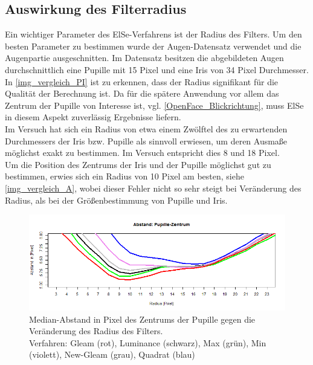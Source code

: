 \subsection{Auswirkung des Filterradius}
Ein wichtiger Parameter des ElSe-Verfahrens ist der Radius des Filters. Um den besten Parameter zu bestimmen wurde der Augen-Datensatz \cite{database_Eye} verwendet und die Augenpartie ausgeschnitten. Im Datensatz besitzen die abgebildeten Augen durchschnittlich eine Pupille mit 15 Pixel und eine Iris von 34 Pixel Durchmesser.\\
In \autoref{img_vergleich_PI} ist zu erkennen, dass der Radius signifikant für die Qualität der Berechnung ist. Da für die spätere Anwendung vor allem das Zentrum der Pupille von Interesse ist, vgl. \autoref{OpenFace_Blickrichtung}, muss ElSe in diesem Aspekt zuverlässig Ergebnisse liefern.\\
Im Versuch hat sich ein Radius von etwa einem Zwölftel des zu erwartenden Durchmessers der Iris bzw. Pupille als sinnvoll erwiesen, um deren Ausmaße möglichst exakt zu bestimmen. Im Versuch entspricht dies 8 und 18 Pixel.\\
Um die Position des Zentrums der Iris und der Pupille möglichst gut zu bestimmen, erwies sich ein Radius von 10 Pixel am besten, siehe \autoref{img_vergleich_A}, wobei dieser Fehler nicht so sehr steigt bei Veränderung des Radius, als bei der Größenbestimmung von Pupille und Iris.
\begin{figure}
	\centering
	\includegraphics[width=\linewidth]{Eye_Img_Box/Vergleich_A}
	\caption{Median-Abstand in Pixel des Zentrums der Pupille gegen die Veränderung des Radius des Filters.\\
		Verfahren: Gleam (rot), Luminance (schwarz), Max (grün), Min (violett), New-Gleam (grau), Quadrat (blau)}
	\label{img_vergleich_A}
\end{figure}
